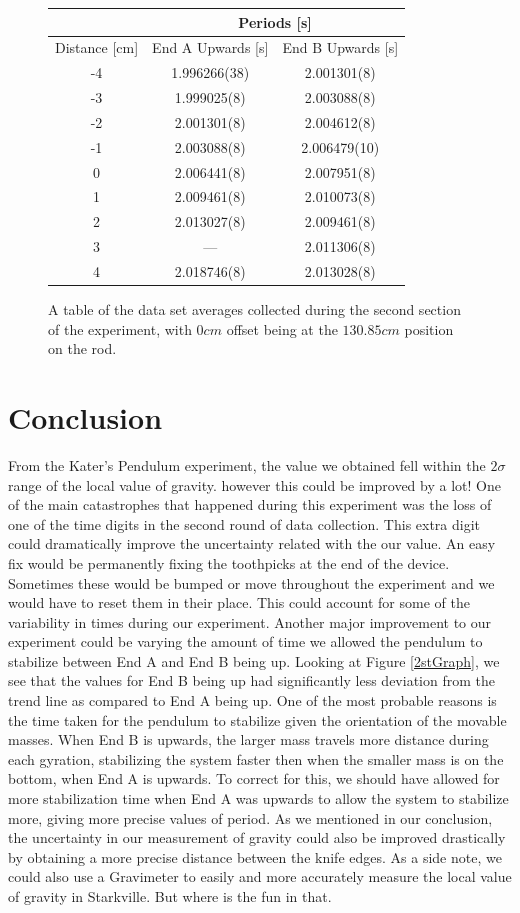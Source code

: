 \documentclass[aps,prl,10pt,twocolumn,floatfix]{revtex4-2}
\begin{document}
\begin{figure}
\begin{tabular}{|c|c|c|}
\hline
& \multicolumn{2}{|c|}{Periods [s]}\\
\hline
Distance [cm] & End A Upwards [s] & End B Upwards [s]\\
\hline
-4&	1.996266(38)&2.001301(8)\\
-3&	1.999025(8) &2.003088(8)\\
-2&	2.001301(8) &2.004612(8)\\
-1&	2.003088(8) &2.006479(10)\\
0&	2.006441(8) &2.007951(8)\\
1&	2.009461(8) &2.010073(8)\\
2&	2.013027(8)&2.009461(8)\\
3&	--- &2.011306(8)\\
4&	2.018746(8) &2.013028(8)\\
\hline
\end{tabular}
\caption{A table of the data set averages collected during the second section of the experiment, with $0cm$ offset being at the $130.85cm$ position on the rod.}
\label{2ndTable}
\end{figure}


\section{Conclusion}
From the Kater's Pendulum experiment, the value we obtained fell within the $2\sigma$ range of the local value of gravity.
however this could be improved by a lot!
One of the main catastrophes that happened during this experiment was the loss of one of the time digits in the second round of data collection. 
This extra digit could dramatically improve the uncertainty related with the our value.
An easy fix would be permanently fixing the toothpicks at the end of the device.
Sometimes these would be bumped or move throughout the experiment and we would have to reset them in their place.
This could account for some of the variability in times during our experiment. 
Another major improvement to our experiment could be varying the amount of time we allowed the pendulum to stabilize between End A and End B being up.
Looking at Figure \ref{2stGraph}, we see that the values for End B being up had significantly less deviation from the trend line as compared to End A being up. 
One of the most probable reasons is the time taken for the pendulum to stabilize given the orientation of the movable masses. 
When End B is upwards, the larger mass travels more distance during each gyration, stabilizing the system faster then when the smaller mass is on the bottom, when End A is upwards. 
To correct for this, we should have allowed for more stabilization time when End A was upwards to allow the system to stabilize more, giving more precise values of period. 
As we mentioned in our conclusion, the uncertainty in our measurement of gravity could also be improved drastically by obtaining a more precise distance between the knife edges.
As a side note, we could also use a Gravimeter to easily and more accurately measure the local value of gravity in Starkville.
But where is the fun in that.
\end{document}
